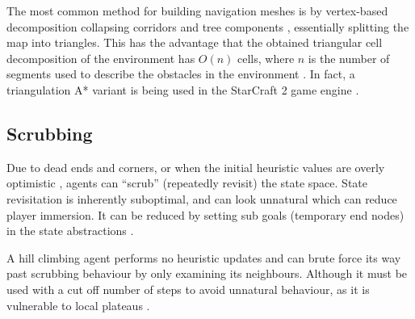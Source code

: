 \documentclass{scrartcl}
\begin{document}
The most common method for building navigation meshes is by vertex-based decomposition \cite{hale2009full} collapsing corridors and tree components \cite{demyen2006efficient}, essentially splitting the map into triangles.  This has the advantage that the obtained triangular cell decomposition of the environment has $O(n)$ cells, where $n$ is the number of segments used to describe the obstacles in the environment \cite{kallmann2010navigation}.  In fact, a triangulation A* variant is being used in the StarCraft 2 game engine \cite{ontanon2013survey}.

\subsection*{Scrubbing}

Due to dead ends and corners, or when the initial heuristic values are overly optimistic \cite{bulitko2011real}, agents can ``scrub'' (repeatedly revisit) the state space.  State revisitation is inherently suboptimal, and can look unnatural which can reduce player immersion.  It can be reduced by setting sub goals (temporary end nodes) in the state abstractions \cite{bulitko2010case}.

A hill climbing agent performs no heuristic updates \cite{huntley2013search} and can brute force its way past scrubbing behaviour by only examining its neighbours.  Although it must be used with a cut off number of steps to avoid unnatural behaviour, as it is vulnerable to local plateaus \cite{richards1992learning}.



\end{document}

